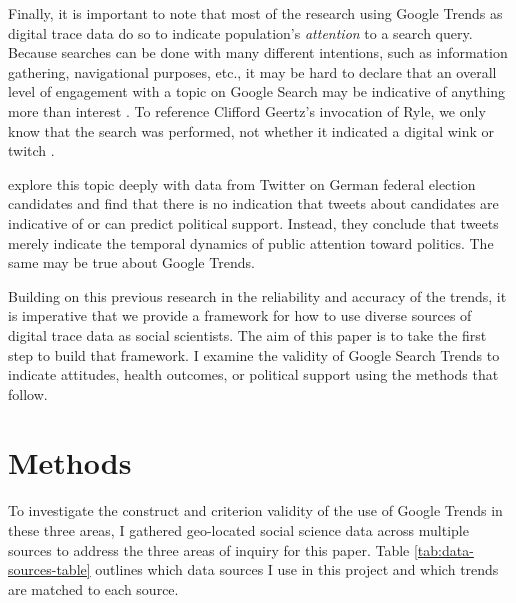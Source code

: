 Finally, it is important to note that most of the research using 
Google Trends as digital trace data do so to indicate
population's \textit{attention} to a search query. Because
searches can be done with many different intentions, such as 
information gathering, navigational purposes, etc., it may
be hard to declare that an overall level of engagement with a topic
on Google Search may be indicative of anything more than interest \citep{da2011search}.
To reference Clifford Geertz's invocation of Ryle, we only know that the search was 
performed, not whether it indicated a digital wink or twitch \citeyearpar{geertz1973thick}.

\citet{jungherr_etal17} explore this topic deeply with data from
Twitter on German federal election candidates and find that there is no
indication that tweets about candidates are indicative of or can predict 
political support. Instead, they conclude that tweets merely indicate the
temporal dynamics of public attention toward politics. The same may
be true about Google Trends. 

Building on this previous research in the reliability and accuracy of the trends, 
it is imperative that we provide a framework for how to use diverse sources
of digital trace data as social scientists. The aim of this paper is
to take the first step to build that framework. I examine the validity of 
Google Search Trends to indicate attitudes, health outcomes, or political 
support using the methods that follow.

\section{Methods}

To investigate the construct and criterion validity of the use of Google Trends
in these three areas, I gathered geo-located social science data across multiple
sources to address the three areas of inquiry for this paper.  Table
\ref{tab:data-sources-table} outlines which data sources I use in this
project and which trends are matched to each source.


